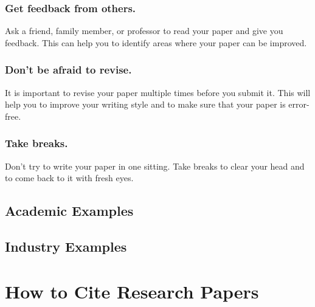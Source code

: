 \documentclass[
  b5paper]{book}
\begin{document}
\hypertarget{get-feedback-from-others.}{%
\subsubsection*{Get feedback from others.}\label{get-feedback-from-others.}}

Ask a friend, family member, or professor to read your paper and give you feedback. This can help you to identify areas where your paper can be improved.

\hypertarget{dont-be-afraid-to-revise.}{%
\subsubsection*{Don't be afraid to revise.}\label{dont-be-afraid-to-revise.}}

It is important to revise your paper multiple times before you submit it. This will help you to improve your writing style and to make sure that your paper is error-free.

\hypertarget{take-breaks.}{%
\subsubsection*{Take breaks.}\label{take-breaks.}}

Don't try to write your paper in one sitting. Take breaks to clear your head and to come back to it with fresh eyes.

\hypertarget{academic-examples}{%
\subsection*{Academic Examples}\label{academic-examples}}

\hypertarget{industry-examples}{%
\subsection*{Industry Examples}\label{industry-examples}}

\hypertarget{how-to-cite-research-papers}{%
\section{How to Cite Research Papers}\label{how-to-cite-research-papers}}
\end{document}
